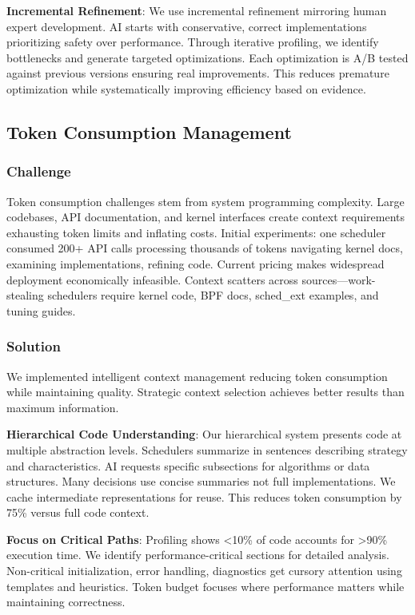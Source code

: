 \textbf{Incremental Refinement}: We use incremental refinement mirroring human expert development. AI starts with conservative, correct implementations prioritizing safety over performance. Through iterative profiling, we identify bottlenecks and generate targeted optimizations. Each optimization is A/B tested against previous versions ensuring real improvements. This reduces premature optimization while systematically improving efficiency based on evidence.

\subsection{Token Consumption Management}

\subsubsection{Challenge}
Token consumption challenges stem from system programming complexity. Large codebases, API documentation, and kernel interfaces create context requirements exhausting token limits and inflating costs. Initial experiments: one scheduler consumed 200+ API calls processing thousands of tokens navigating kernel docs, examining implementations, refining code. Current pricing makes widespread deployment economically infeasible. Context scatters across sources—work-stealing schedulers require kernel code, BPF docs, sched\_ext examples, and tuning guides.

\subsubsection{Solution}
We implemented intelligent context management reducing token consumption while maintaining quality. Strategic context selection achieves better results than maximum information.

\textbf{Hierarchical Code Understanding}: Our hierarchical system presents code at multiple abstraction levels. Schedulers summarize in sentences describing strategy and characteristics. AI requests specific subsections for algorithms or data structures. Many decisions use concise summaries not full implementations. We cache intermediate representations for reuse. This reduces token consumption by 75\% versus full code context.

\textbf{Focus on Critical Paths}: Profiling shows <10\% of code accounts for >90\% execution time. We identify performance-critical sections for detailed analysis. Non-critical initialization, error handling, diagnostics get cursory attention using templates and heuristics. Token budget focuses where performance matters while maintaining correctness.

